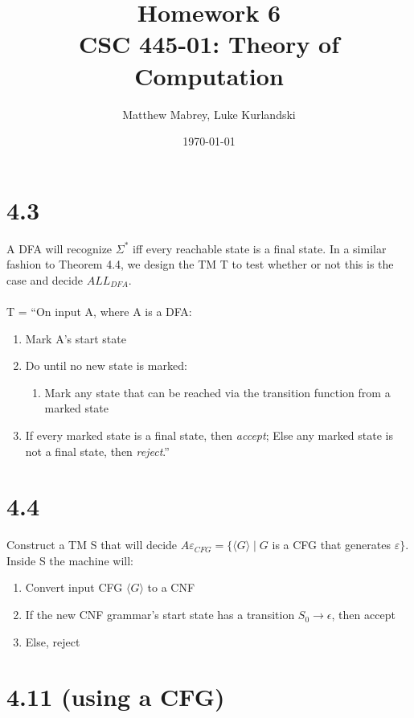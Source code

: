 \documentclass{article}
\title{Homework 6\\[0.2em]\smaller{}CSC 445-01: Theory of Computation}
\author{Matthew Mabrey, Luke Kurlandski}
\date{\today}
\begin{document}
\maketitle

\section*{4.3}

A DFA will recognize $\Sigma^*$ iff every reachable state is a final state. In a similar fashion to Theorem 4.4, we design the TM T to test whether or not this is the case and decide $ALL_{DFA}$.\\\\
T = ``On input A, where A is a DFA:
\begin{enumerate}
    \item Mark A's start state
    \item Do until no new state is marked:
    \begin{enumerate}
        \item Mark any state that can be reached via the transition function from a marked state
    \end{enumerate}
    \item If every marked state is a final state, then \textit{accept}; Else any marked state is not a final state, then \textit{reject}.''
\end{enumerate}

\section*{4.4}
Construct a TM S that will decide $A\varepsilon_{CFG} = \{\langle G \rangle \mid G$ is a CFG that generates $\varepsilon\}$. Inside S the machine will:
\begin{enumerate}
    \item Convert input CFG $\langle G \rangle$ to a CNF
    \item If the new CNF grammar's start state has a transition $S_0 \rightarrow \epsilon$, then accept
    \item Else, reject
\end{enumerate}

\section*{4.11 (using a CFG)}
\end{document}
